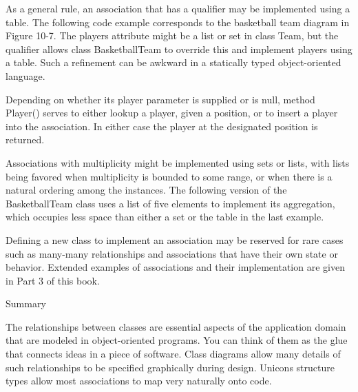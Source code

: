 As a general rule, an association that has a qualifier may be
implemented using a table. The following code example corresponds to
the basketball team diagram in Figure 10-7. The players attribute might
be a list or set in class Team, but the qualifier allows class
BasketballTeam to override this and implement players using a table.
Such a refinement can be awkward in a statically typed object-oriented
language.

Depending on whether its player parameter is supplied or is null, method
\textsf{Player()} serves to either lookup a player, given a position,
or to insert a player into the association. In either case the player
at the designated position is returned.


Associations with multiplicity might be implemented using sets or lists,
with lists being favored when multiplicity is bounded to some range, or
when there is a natural ordering among the instances. The following
version of the \textsf{BasketballTeam} class uses a list of five
elements to implement its aggregation, which occupies less space than
either a set or the table in the last example.


Defining a new class to implement an association may be reserved for
rare cases such as many-many relationships and associations that have
their own state or behavior. Extended examples of associations and
their implementation are given in Part 3 of this book.

{\sffamily
Summary}

The relationships between classes are essential aspects of the
application domain that are modeled in object-oriented programs. You
can think of them as the {\textquotedbl}glue{\textquotedbl} that
connects ideas in a piece of software. Class diagrams allow many
details of such relationships to be specified graphically during
design. Unicon{\textquotesingle}s structure types allow most
associations to map very naturally onto code.

\clearpage
\bigskip
